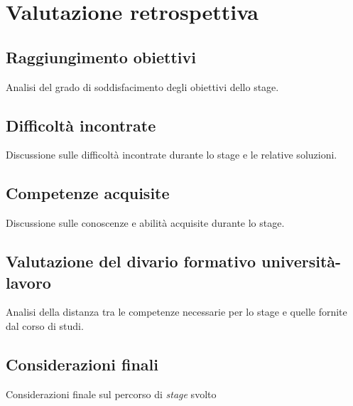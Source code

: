\chapter{Valutazione retrospettiva}
\label{cap:conclusioni}

\section{Raggiungimento obiettivi}
Analisi del grado di soddisfacimento degli obiettivi dello stage.

\section{Difficoltà incontrate}
Discussione sulle difficoltà incontrate durante lo stage e le relative soluzioni.
\section{Competenze acquisite}
Discussione sulle conoscenze e abilità acquisite durante lo stage.

\section{Valutazione del divario formativo università-lavoro}
Analisi della distanza tra le competenze necessarie per lo stage e quelle fornite dal corso di studi.

\section{Considerazioni finali}
Considerazioni finale sul percorso di \textit{stage} svolto
